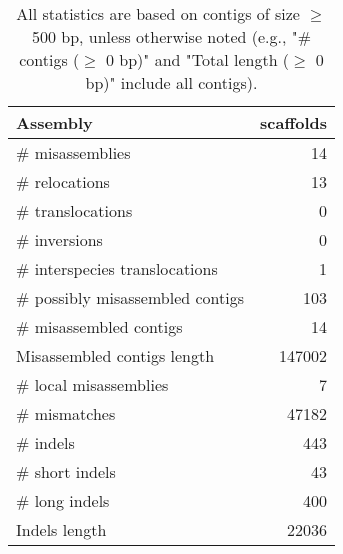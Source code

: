 \documentclass[12pt,a4paper]{article}
\begin{document}
\begin{table}[ht]
\begin{center}
\caption{All statistics are based on contigs of size $\geq$ 500 bp, unless otherwise noted (e.g., "\# contigs ($\geq$ 0 bp)" and "Total length ($\geq$ 0 bp)" include all contigs).}
\begin{tabular}{|l*{1}{|r}|}
\hline
Assembly & scaffolds \\ \hline
\# misassemblies & 14 \\ \hline
\hspace{5mm}\# relocations & 13 \\ \hline
\hspace{5mm}\# translocations & 0 \\ \hline
\hspace{5mm}\# inversions & 0 \\ \hline
\hspace{5mm}\# interspecies translocations & 1 \\ \hline
\# possibly misassembled contigs & 103 \\ \hline
\# misassembled contigs & 14 \\ \hline
Misassembled contigs length & 147002 \\ \hline
\# local misassemblies & 7 \\ \hline
\# mismatches & 47182 \\ \hline
\# indels & 443 \\ \hline
\hspace{5mm}\# short indels & 43 \\ \hline
\hspace{5mm}\# long indels & 400 \\ \hline
Indels length & 22036 \\ \hline
\end{tabular}
\end{center}
\end{table}
\end{document}
